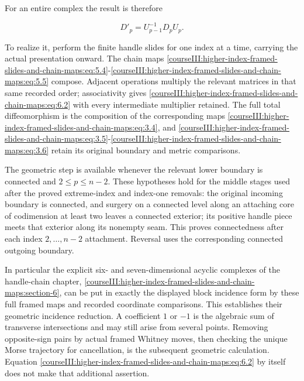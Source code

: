 For an entire complex the result is therefore

\begin{equation}
D'_p=U_{p-1}^{-1}D_pU_p.
 \label{courseIII:higher-index-framed-slides-and-chain-maps:eq:6.2}
\end{equation}

To realize it, perform the finite handle slides for one index at a time, carrying the actual presentation onward. The chain maps \eqref{courseIII:higher-index-framed-slides-and-chain-maps:eq:5.4}-\eqref{courseIII:higher-index-framed-slides-and-chain-maps:eq:5.5} compose. Adjacent operations multiply the relevant matrices in that same recorded order; associativity gives \eqref{courseIII:higher-index-framed-slides-and-chain-maps:eq:6.2} with every intermediate multiplier retained. The full total diffeomorphism is the composition of the corresponding maps \eqref{courseIII:higher-index-framed-slides-and-chain-maps:eq:3.4}, and \eqref{courseIII:higher-index-framed-slides-and-chain-maps:eq:3.5}-\eqref{courseIII:higher-index-framed-slides-and-chain-maps:eq:3.6} retain its original boundary and metric comparisons.

The geometric step is available whenever the relevant lower boundary is connected and \(2\leq p\leq n-2\). These hypotheses hold for the middle stages used after the proved extreme-index and index-one removals: the original incoming boundary is connected, and surgery on a connected level along an attaching core of codimension at least two leaves a connected exterior; its positive handle piece meets that exterior along its nonempty seam. This proves connectedness after each index \(2,\ldots,n-2\) attachment. Reversal uses the corresponding connected outgoing boundary.

In particular the explicit six- and seven-dimensional acyclic complexes of the handle-chain chapter, \cref{courseIII:higher-index-framed-slides-and-chain-maps:section-6}, can be put in exactly the displayed block incidence form by these full framed maps and recorded coordinate comparisons. This establishes their geometric incidence reduction. A coefficient \(1\) or \(-1\) is the algebraic sum of transverse intersections and may still arise from several points. Removing opposite-sign pairs by actual framed Whitney moves, then checking the unique Morse trajectory for cancellation, is the subsequent geometric calculation. Equation \eqref{courseIII:higher-index-framed-slides-and-chain-maps:eq:6.2} by itself does not make that additional assertion.

